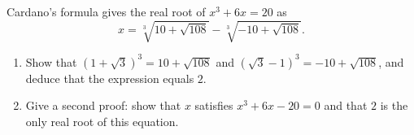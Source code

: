 Cardano's formula gives the real root of $x^3+6x=20$ as
\[x=\sqrt[3]{10+\sqrt{108}}-\sqrt[3]{-10+\sqrt{108}}.\]
\begin{enumerate}
\item[(a)] Show that $\left(1+\sqrt3\right)^3=10+\sqrt{108}$ and $\left(\sqrt3-1\right)^3=-10+\sqrt{108}$, and deduce that the expression equals $2$.
\item[(b)] Give a second proof: show that $x$ satisfies $x^3+6x-20=0$ and that $2$ is the only real root of this equation.
\end{enumerate}
